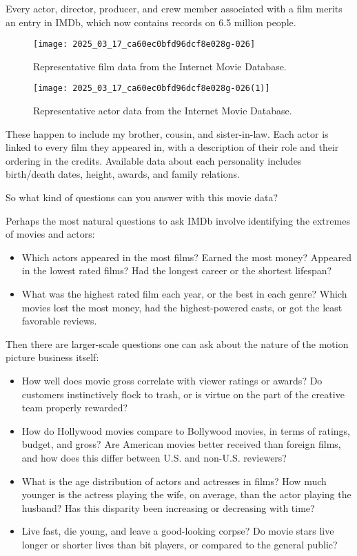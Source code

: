 \documentclass[10pt]{article}
\begin{document}
Every actor, director, producer, and crew member associated with a film merits an entry in IMDb, which now contains records on 6.5 million people.

\begin{figure}[h]
    \centering
    \texttt{[image: 2025\_03\_17\_ca60ec0bfd96dcf8e028g-026]}
    \caption{Representative film data from the Internet Movie Database.}
\end{figure}

\begin{figure}[h]
    \centering
    \texttt{[image: 2025\_03\_17\_ca60ec0bfd96dcf8e028g-026(1)]}
    \caption{Representative actor data from the Internet Movie Database.}
\end{figure}

These happen to include my brother, cousin, and sister-in-law. Each actor is linked to every film they appeared in, with a description of their role and their ordering in the credits. Available data about each personality includes birth/death dates, height, awards, and family relations.

So what kind of questions can you answer with this movie data?

Perhaps the most natural questions to ask IMDb involve identifying the extremes of movies and actors:

\begin{itemize}
  \item Which actors appeared in the most films? Earned the most money? Appeared in the lowest rated films? Had the longest career or the shortest lifespan?
  \item What was the highest rated film each year, or the best in each genre? Which movies lost the most money, had the highest-powered casts, or got the least favorable reviews.
\end{itemize}

Then there are larger-scale questions one can ask about the nature of the motion picture business itself:

\begin{itemize}
  \item How well does movie gross correlate with viewer ratings or awards? Do customers instinctively flock to trash, or is virtue on the part of the creative team properly rewarded?
  \item How do Hollywood movies compare to Bollywood movies, in terms of ratings, budget, and gross? Are American movies better received than foreign films, and how does this differ between U.S. and non-U.S. reviewers?
  \item What is the age distribution of actors and actresses in films? How much younger is the actress playing the wife, on average, than the actor playing the husband? Has this disparity been increasing or decreasing with time?
  \item Live fast, die young, and leave a good-looking corpse? Do movie stars live longer or shorter lives than bit players, or compared to the general public?
\end{itemize}
\end{document}

